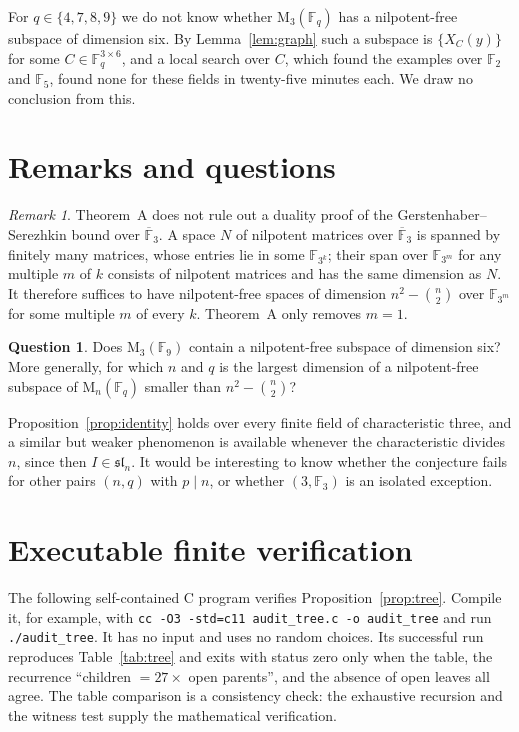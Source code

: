 \documentclass[screen]{aomart}
\theoremstyle{definition}
\newtheorem{question}[theorem]{Question}
\theoremstyle{remark}
\newtheorem{remark}[theorem]{Remark}
\numberwithin{equation}{section}
\newcommand{\F}{\mathbb{F}}
\newcommand{\M}{\mathrm{M}}
\newcommand{\sll}{\mathfrak{sl}}
\begin{document}
For $q\in\{4,7,8,9\}$ we do not know whether $\M_3(\F_q)$ has a nilpotent-free subspace of dimension six. By Lemma~\ref{lem:graph} such a subspace is $\{X_C(y)\}$ for some $C\in\F_q^{3\times6}$, and a local search over $C$, which found the examples over $\F_2$ and $\F_5$, found none for these fields in twenty-five minutes each. We draw no conclusion from this.

\section{Remarks and questions}\label{sec:questions}

\begin{remark}\label{rem:transfer}
Theorem~A does not rule out a duality proof of the Gersten\-haber--\hspace{0pt}Serezhkin bound over $\overline{\F}_3$. A space $N$ of nilpotent matrices over $\overline{\F}_3$ is spanned by finitely many matrices, whose entries lie in some $\F_{3^k}$; their span over $\F_{3^m}$ for any multiple $m$ of $k$ consists of nilpotent matrices and has the same dimension as $N$. It therefore suffices to have nilpotent-free spaces of dimension $n^2-\binom n2$ over $\F_{3^m}$ for some multiple $m$ of every $k$. Theorem~A only removes $m=1$.
\end{remark}

\begin{question}
Does $\M_3(\F_9)$ contain a nilpotent-free subspace of dimension six? More generally, for which $n$ and $q$ is the largest dimension of a nilpotent-free subspace of $\M_n(\F_q)$ smaller than $n^2-\binom n2$?
\end{question}

Proposition~\ref{prop:identity} holds over every finite field of characteristic three, and a similar but weaker phenomenon is available whenever the characteristic divides $n$, since then $I\in\sll_n$. It would be interesting to know whether the conjecture fails for other pairs $(n,q)$ with $p\mid n$, or whether $(3,\F_3)$ is an isolated exception.

\appendix
\section{Executable finite verification}\label{app:verifier}
The following self-contained C program verifies Proposition~\ref{prop:tree}. Compile it, for example, with \texttt{cc -O3 -std=c11 audit\_tree.c -o audit\_tree} and run \texttt{./audit\_tree}. It has no input and uses no random choices. Its successful run reproduces Table~\ref{tab:tree} and exits with status zero only when the table, the recurrence ``children $=27\times$ open parents'', and the absence of open leaves all agree. The table comparison is a consistency check: the exhaustive recursion and the witness test supply the mathematical verification.
\end{document}
